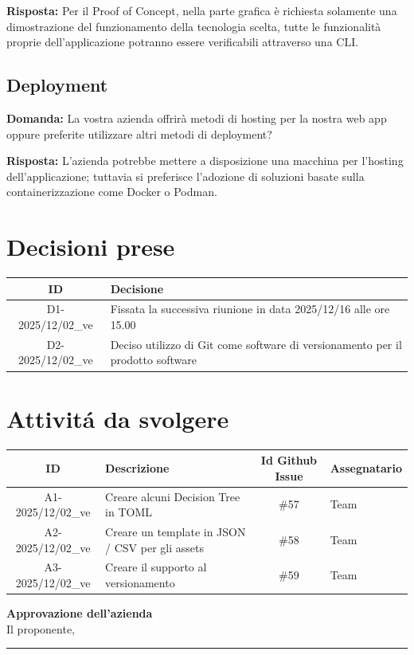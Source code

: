 \documentclass[a4paper,12pt]{article}
\newcommand{\DataVerbale}{2025/12/02}
\begin{document}
{    \textbf{Risposta:} Per il Proof of Concept, nella parte grafica è richiesta solamente una dimostrazione del funzionamento della tecnologia scelta, tutte le funzionalità proprie dell'applicazione potranno essere verificabili attraverso una CLI. 
    \subsection{Deployment}
    \textbf{Domanda:} La vostra azienda offrirà metodi di hosting per la nostra web app oppure preferite utilizzare altri metodi di deployment?
    
    \textbf{Risposta:} L'azienda potrebbe mettere a disposizione una macchina per l'hosting dell'applicazione; tuttavia si preferisce l'adozione di soluzioni basate sulla containerizzazione come Docker o Podman.


}
\newpage

\section{Decisioni prese}{
    \begin{center}
    \begin{tabular}{|c|p{12cm}|}
        \hline
        \textbf{ID} & \textbf{Decisione} \\
        \hline
            D1-\DataVerbale\_ve & Fissata la successiva riunione in data 2025/12/16 alle ore 15.00 \\
        \hline
            D2-\DataVerbale\_ve & Deciso utilizzo di Git come software di versionamento per il prodotto software \\
        \hline
    \end{tabular}
    \end{center}
}

\section{Attivitá da svolgere}{
    \begin{center}
    \begin{tabular}{|c|p{4.5cm}|c|p{3cm}|} 
        \hline
        \textbf{ID} & \textbf{Descrizione} & \textbf{Id Github Issue} & \textbf{Assegnatario}\\
        \hline
            A1-\DataVerbale\_ve & Creare alcuni Decision Tree in TOML & \#57 & Team \\
        \hline
            A2-\DataVerbale\_ve & Creare un template in JSON / CSV per gli assets & \#58 & Team \\
        \hline
            A3-\DataVerbale\_ve & Creare il supporto al versionamento & \#59 & Team \\
        \hline
    \end{tabular}
    \end{center}
}

\vspace{2cm}
\begin{flushright}
    \textbf{Approvazione dell'azienda} \\
    Il proponente,\\[0.5cm]
    \rule{6cm}{0.4pt}\\
\end{flushright}
\end{document}
